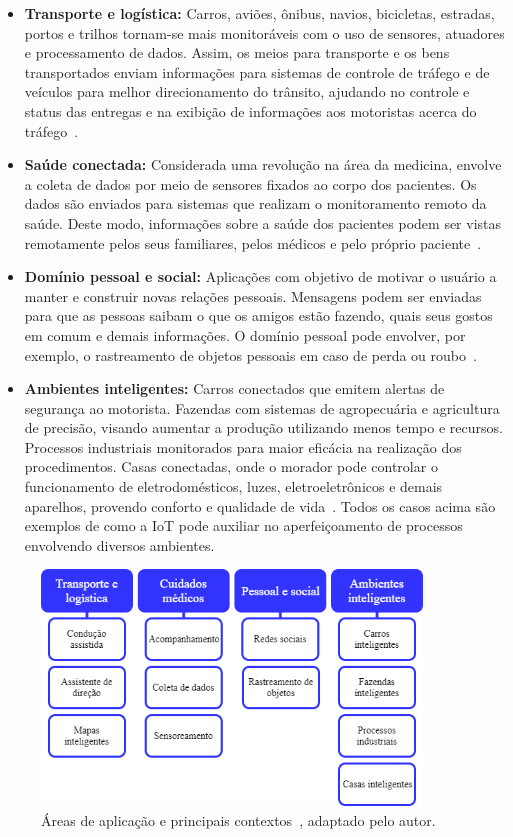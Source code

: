 \begin{itemize}
    \item \textbf{Transporte e logística:} Carros, aviões, ônibus, navios, bicicletas, estradas, portos e trilhos tornam-se mais monitoráveis com o uso de sensores, atuadores e processamento de dados. Assim, os meios para transporte e os bens transportados enviam informações para sistemas de controle de tráfego e de veículos para melhor direcionamento do trânsito, ajudando no controle e status das entregas e na exibição de informações aos motoristas acerca do tráfego~\cite{atzori2010internet}.
    \item \textbf{Saúde conectada:} Considerada uma revolução na área da medicina, envolve a coleta de dados por meio de sensores fixados ao corpo dos pacientes. Os dados são enviados para sistemas que realizam o monitoramento remoto da saúde. Deste modo, informações sobre a saúde dos pacientes podem ser vistas remotamente pelos seus familiares, pelos médicos e pelo próprio paciente~\cite{sankarinternet}.
    \item \textbf{Domínio pessoal e social:} Aplicações com objetivo de motivar o usuário a manter e construir novas relações pessoais. Mensagens podem ser enviadas para que as pessoas saibam o que os amigos estão fazendo, quais seus gostos em comum e demais informações. O domínio pessoal pode envolver, por exemplo, o rastreamento de objetos pessoais em caso de perda ou roubo~\cite{atzori2010internet}.
    \item \textbf{Ambientes inteligentes:} Carros conectados que emitem alertas de segurança ao motorista. Fazendas com sistemas de agropecuária e agricultura de precisão, visando aumentar a produção utilizando menos tempo e recursos. Processos industriais monitorados para maior eficácia na realização dos procedimentos. Casas conectadas, onde o morador pode controlar o funcionamento de eletrodomésticos, luzes, eletroeletrônicos e demais aparelhos, provendo conforto e qualidade de vida~\cite{sankarinternet, bandyopadhyay2011internet, atzori2010internet}. Todos os casos acima são exemplos de como a IoT pode auxiliar no aperfeiçoamento de processos envolvendo diversos ambientes. 
\end{itemize}

\begin{figure}[ht]
\centering
\includegraphics[width=0.9\textwidth]{imagens/iot_fields.png}
\caption{Áreas de aplicação e principais contextos~\cite{atzori2010internet}, adaptado pelo autor.
\label{fig:iot_fields}}
\end{figure}
\FloatBarrier

